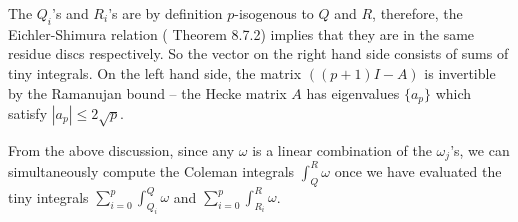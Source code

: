  The $Q_i$'s and $R_i$'s are by definition $p$-isogenous to $Q$ and $R$, therefore, the Eichler-Shimura relation (\cite{Shurman} Theorem 8.7.2) implies that they are in the same residue discs respectively. So the vector on the right hand side consists of sums of tiny integrals. On the left hand side, the matrix $((p+1)I - A)$ is invertible by the Ramanujan bound -- the Hecke matrix $A$ has eigenvalues $\{a_p\}$ which satisfy $|a_p| \leq 2 \sqrt{p}$.

From the above discussion, since any $\omega$ is a linear combination of the $\omega_j$'s, we can simultaneously compute the Coleman integrals $\int_Q^R \omega$ once we have evaluated the tiny integrals $\sum_{i=0}^p \int_{Q_i}^Q \omega$ and $\sum_{i=0}^p \int_{R_i}^R \omega$.